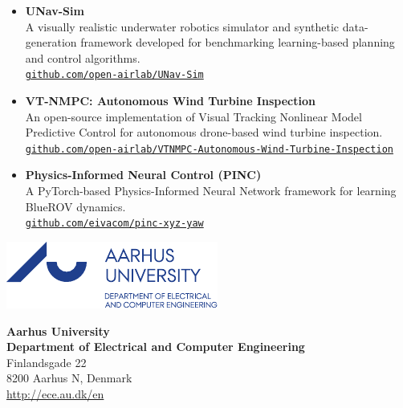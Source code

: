 \begin{itemize}
    \item \textbf{UNav-Sim} \\
    A visually realistic underwater robotics simulator and synthetic data-generation framework developed for benchmarking learning-based planning and control algorithms.\\
    \href{https://github.com/open-airlab/UNav-Sim}{\texttt{github.com/open-airlab/UNav-Sim}}

    \item \textbf{VT-NMPC: Autonomous Wind Turbine Inspection} \\
    An open-source implementation of Visual Tracking Nonlinear Model Predictive Control for autonomous drone-based wind turbine inspection.\\
    \href{https://github.com/open-airlab/VTNMPC-Autonomous-Wind-Turbine-Inspection}{\texttt{github.com/open-airlab/VTNMPC-Autonomous-Wind-Turbine-Inspection}}

    \item \textbf{Physics-Informed Neural Control (PINC)} \\
    A PyTorch-based Physics-Informed Neural Network framework for learning BlueROV dynamics. \\
    \href{https://github.com/eivacom/pinc-xyz-yaw}{\texttt{github.com/eivacom/pinc-xyz-yaw}}
\end{itemize}





\cleardoublepage


\BgThispage  %

\begin{minipage}[t]{0.48\textwidth}
	\vspace*{0pt}			%
	\includegraphics[width=0.74\linewidth]{figs/logos/AUpantoneBlueMPE.pdf}
\end{minipage}
\hfill
\begin{minipage}[t]{0.3\textwidth}
    \begin{flushright}
        {\small 
        \textbf{Aarhus University \\
        Department of Electrical
        and Computer Engineering} \\
        Finlandsgade 22 \\
        8200 Aarhus N, Denmark \\
        \url{http://ece.au.dk/en}}
    \end{flushright}
\end{minipage}

